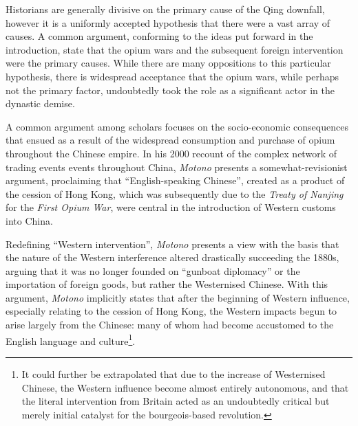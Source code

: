 \documentclass[a4paper,oneside]{article}
\begin{document}
Historians are generally divisive on the primary cause of the Qing downfall,
however it is a uniformly accepted hypothesis that there were a vast array of
causes. A common argument, conforming to the ideas put forward in the
introduction, state that the opium wars and the subsequent foreign intervention
were the primary causes. While there are many oppositions to this particular
hypothesis, there is widespread acceptance that the opium wars, while perhaps
not the primary factor, undoubtedly took the role as a significant actor in the
dynastic demise.

A common argument among scholars focuses on the socio-economic consequences that
ensued as a result of the widespread consumption and purchase of opium
throughout the Chinese empire. In his 2000 recount of the complex network of
trading events events throughout China, \textit{Motono} presents a
somewhat-revisionist argument, proclaiming that ``English-speaking Chinese'',
created as a product of the cession of Hong Kong, which was subsequently due to
the \textit{Treaty of Nanjing} for the \textit{First Opium War}, were central in
the introduction of Western customs into China.

Redefining ``Western intervention'', \textit{Motono} presents a view with the
basis that the nature of the Western interference altered drastically succeeding
the 1880s, arguing that it was no longer founded on ``gunboat diplomacy'' or the
importation of foreign goods, but rather the Westernised Chinese. With this
argument, \textit{Motono} implicitly states that after the beginning of Western
influence, especially relating to the cession of Hong Kong, the Western impacts
begun to arise largely from the Chinese: many of whom had become accustomed to
the English language and culture\footnote{It could further be extrapolated that
due to the increase of Westernised Chinese, the Western influence become almost
entirely autonomous, and that the literal intervention from Britain acted as an
undoubtedly critical but merely initial catalyst for the bourgeois-based
revolution.}.

\end{document}
